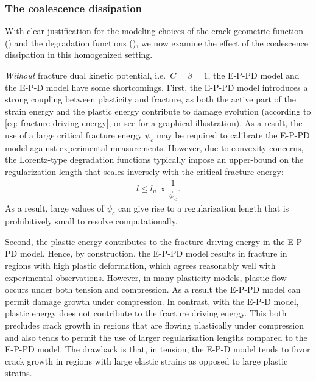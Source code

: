 \subsubsection{The coalescence dissipation}
\label{section: Chapter5/verification/homogenized/coalescence}

With clear justification for the modeling choices of the crack geometric function () and the degradation functions (), we now examine the effect of the coalescence dissipation in this homogenized setting.

\textit{Without} fracture dual kinetic potential, i.e.\ $C = \beta = 1$, the E-P-PD model and the E-P-D model have some shortcomings.
First, the E-P-PD model introduces a strong coupling between plasticity and fracture, as both the active part of the strain energy and the plastic energy contribute to damage evolution (according to \eqref{eq: fracture driving energy}, or see  for a graphical illustration). As a result, the use of a large critical fracture energy $\psi_c$ may be required to calibrate the E-P-PD model against experimental measurements. However, due to convexity concerns, the Lorentz-type degradation functions typically impose an upper-bound on the regularization length that scales inversely with the critical fracture energy:
\begin{align}
  l \leqslant l_u \propto \dfrac{1}{\psi_c}.
  \label{eq: upper bound}
\end{align}
As a result, large values of $\psi_c$ can give rise to a regularization length that is prohibitively small to resolve computationally.



Second, the plastic energy contributes to the fracture driving energy in the E-P-PD model. Hence, by construction, the E-P-PD model results in fracture in regions with high plastic deformation, which agrees reasonably well with experimental observations. However, in many plasticity models, plastic flow occurs under both tension and compression. As a result the E-P-PD model can permit damage growth under compression. In contrast, with the E-P-D model, plastic energy does not contribute to the fracture driving energy.  This both precludes crack growth in regions that are flowing plastically under compression and also tends to permit the use of larger regularization lengths compared to the E-P-PD model.  The drawback is that, in tension, the E-P-D model tends to favor crack growth in regions with large elastic strains as opposed to large plastic strains.

